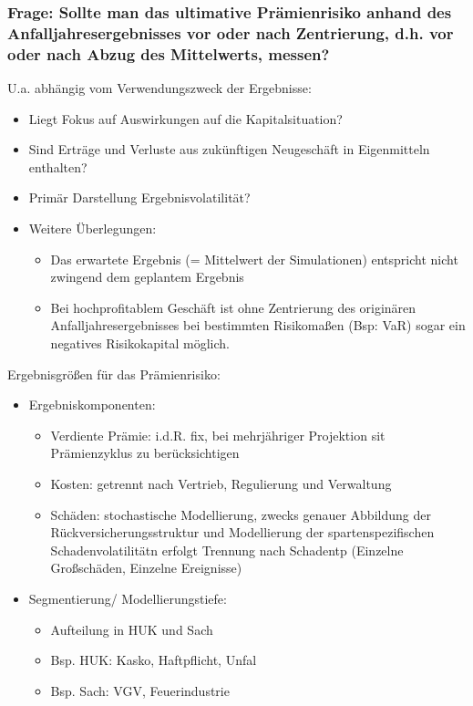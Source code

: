 \documentclass[12pt]{report}
\theoremstyle{dotless}
\theoremstyle{definition}
\begin{document}
\subsubsection{Frage: Sollte man das ultimative Prämienrisiko anhand des Anfalljahresergebnisses vor oder nach Zentrierung, d.h. vor oder nach Abzug des Mittelwerts, messen?}
U.a. abhängig vom Verwendungszweck der Ergebnisse:
\begin{itemize}
\item Liegt Fokus auf Auswirkungen auf die Kapitalsituation?
\item Sind Erträge und Verluste aus zukünftigen Neugeschäft in Eigenmitteln enthalten?
\item Primär Darstellung Ergebnisvolatilität?
\item Weitere Überlegungen:
\begin{itemize}
\item Das erwartete Ergebnis (= Mittelwert der Simulationen) entspricht nicht zwingend dem geplantem Ergebnis
\item Bei hochprofitablem Geschäft ist ohne Zentrierung des originären Anfalljahresergebnisses bei bestimmten Risikomaßen (Bsp: VaR) sogar ein negatives Risikokapital möglich.
\end{itemize}
\end{itemize}

Ergebnisgrößen für das Prämienrisiko:
\begin{itemize}
\item Ergebniskomponenten:
\begin{itemize}
\item Verdiente Prämie: i.d.R. fix, bei mehrjähriger Projektion sit Prämienzyklus zu berücksichtigen
\item Kosten: getrennt nach Vertrieb, Regulierung und Verwaltung
\item Schäden: stochastische Modellierung, zwecks genauer Abbildung der Rückversicherungsstruktur und Modellierung der spartenspezifischen Schadenvolatilitätn erfolgt Trennung nach Schadentp (Einzelne Großschäden, Einzelne Ereignisse)
\end{itemize}
\item Segmentierung/ Modellierungstiefe: 
\begin{itemize}
\item Aufteilung in HUK und Sach
\item Bsp. HUK: Kasko, Haftpflicht, Unfal
\item Bsp. Sach: VGV, Feuerindustrie
\end{itemize}
\end{itemize}
\end{document}

